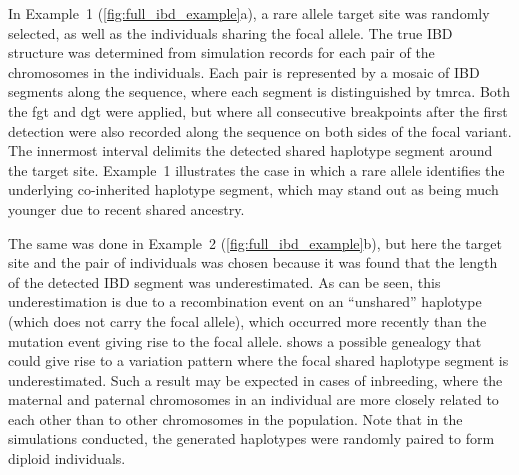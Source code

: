 In Example~1 (\ref{fig:full_ibd_example}{a}), a rare allele target site was randomly selected, as well as the  individuals sharing the focal allele.
The true IBD structure was determined from simulation records for each pair of the  chromosomes in the  individuals.
Each pair is represented by a mosaic of IBD segments along the sequence, where each segment is distinguished by \gls{tmrca}.
Both the \gls{fgt} and \gls{dgt} were applied, but where all consecutive breakpoints after the first detection were also recorded along the sequence on both sides of the focal variant.
The innermost interval delimits the detected shared haplotype segment around the target site.
Example~1 illustrates the case in which a rare allele identifies the underlying co-inherited haplotype segment, which may stand out as being much younger due to recent shared ancestry.

%

%

The same was done in Example~2 (\ref{fig:full_ibd_example}{b}), but here the target site and the pair of individuals was chosen because it was found that the length of the detected IBD segment was underestimated.
As can be seen, this underestimation is due to a recombination event on an ``unshared'' haplotype (which does not carry the focal allele), which occurred more recently than the mutation event giving rise to the focal allele.
 shows a possible genealogy that could give rise to a variation pattern where the focal shared haplotype segment is underestimated.
Such a result may be expected in cases of inbreeding, where the maternal and paternal chromosomes in an individual are more closely related to each other than to other chromosomes in the population.
Note that in the simulations conducted, the generated haplotypes were randomly paired to form diploid individuals.



